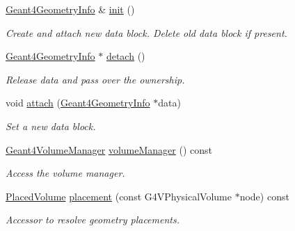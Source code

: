 \begin{DoxyCompactItemize}
\hyperlink{class_d_d4hep_1_1_simulation_1_1_geant4_geometry_info}{Geant4GeometryInfo} \& \hyperlink{class_d_d4hep_1_1_simulation_1_1_geant4_mapping_a241f6e8f761d19caf370fe43fbf22015}{init} ()
\begin{DoxyCompactList}\small\item\em Create and attach new data block. Delete old data block if present. \item\end{DoxyCompactList}\item 
\hyperlink{class_d_d4hep_1_1_simulation_1_1_geant4_geometry_info}{Geant4GeometryInfo} $\ast$ \hyperlink{class_d_d4hep_1_1_simulation_1_1_geant4_mapping_a9d02ac3bbf930ce7a07694a296eaa8a2}{detach} ()
\begin{DoxyCompactList}\small\item\em Release data and pass over the ownership. \item\end{DoxyCompactList}\item 
void \hyperlink{class_d_d4hep_1_1_simulation_1_1_geant4_mapping_a10366f0a203f866a02f9e550d7a9d950}{attach} (\hyperlink{class_d_d4hep_1_1_simulation_1_1_geant4_geometry_info}{Geant4GeometryInfo} $\ast$data)
\begin{DoxyCompactList}\small\item\em Set a new data block. \item\end{DoxyCompactList}\item 
\hyperlink{class_d_d4hep_1_1_simulation_1_1_geant4_volume_manager}{Geant4VolumeManager} \hyperlink{class_d_d4hep_1_1_simulation_1_1_geant4_mapping_adee7ce5478c0903bb899de5e30268d5e}{volumeManager} () const 
\begin{DoxyCompactList}\small\item\em Access the volume manager. \item\end{DoxyCompactList}\item 
\hyperlink{class_d_d4hep_1_1_geometry_1_1_placed_volume}{PlacedVolume} \hyperlink{class_d_d4hep_1_1_simulation_1_1_geant4_mapping_ae8bbc46d6f8a7d3a8b2ffd1322a01d1e}{placement} (const G4VPhysicalVolume $\ast$node) const 
\begin{DoxyCompactList}\small\item\em Accessor to resolve geometry placements. \item\end{DoxyCompactList}\end{DoxyCompactItemize}
